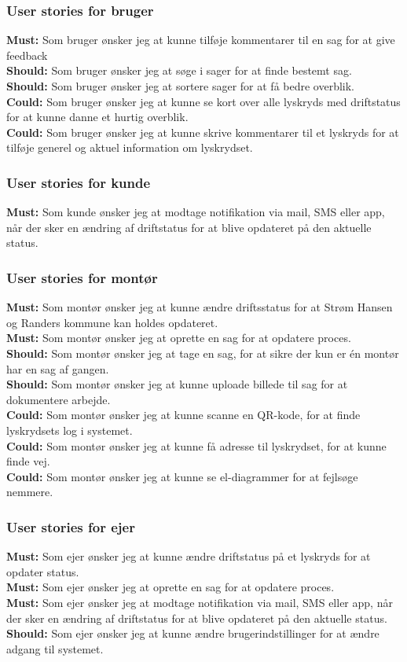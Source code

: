 \subsubsection{User stories for bruger}
\textbf{Must:} Som bruger ønsker jeg at kunne tilføje kommentarer til en sag for at give feedback\\
\textbf{Should:} Som bruger ønsker jeg at søge i sager for at finde bestemt sag.\\
\textbf{Should:} Som bruger ønsker jeg at sortere sager for at få bedre overblik.\\
\textbf{Could:}  Som bruger ønsker jeg at kunne se kort over alle lyskryds med driftstatus for at kunne danne et hurtig overblik.\\
\textbf{Could:} Som bruger ønsker jeg at kunne skrive kommentarer til et lyskryds for at tilføje generel og aktuel information om lyskrydset.

\subsubsection{User stories for kunde}
\textbf{Must:} Som kunde ønsker jeg at modtage notifikation via mail, SMS eller app, når der sker en ændring af driftstatus for at blive opdateret på den aktuelle status.

\subsubsection{User stories for montør}
\textbf{Must:} Som montør ønsker jeg at kunne ændre driftsstatus for at Strøm Hansen og Randers kommune kan holdes opdateret.\\
\textbf{Must:} Som montør ønsker jeg at oprette en sag for at opdatere proces.\\	
\textbf{Should:} Som montør ønsker jeg at tage en sag, for at sikre der kun er én montør har en sag af gangen.\\
\textbf{Should:} Som montør ønsker jeg at kunne uploade billede til sag for at dokumentere arbejde.\\
\textbf{Could:} Som montør ønsker jeg at kunne scanne en QR-kode, for at finde lyskrydsets log i systemet.\\
\textbf{Could:} Som montør ønsker jeg at kunne få adresse til lyskrydset, for at kunne finde vej.\\
\textbf{Could:} Som montør ønsker jeg at kunne se el-diagrammer for at fejlsøge nemmere.

\subsubsection{User stories for ejer}
\textbf{Must:} Som ejer ønsker jeg at kunne ændre driftstatus på et lyskryds for at opdater status.\\
\textbf{Must:} Som ejer ønsker jeg at oprette en sag for at opdatere proces.\\
\textbf{Must:} Som ejer ønsker jeg at modtage notifikation via mail, SMS eller app, når der sker en ændring af driftstatus for at blive opdateret på den aktuelle status.\\
\textbf{Should:} Som ejer ønsker jeg at kunne ændre brugerindstillinger for at ændre adgang til systemet.

